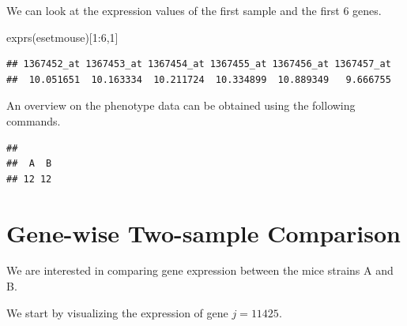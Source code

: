 \documentclass[
]{book}
\newenvironment{Shaded}{\begin{snugshade}}{\end{snugshade}}
\newcommand{\CommentTok}[1]{\textcolor[rgb]{0.56,0.35,0.01}{\textit{#1}}}
\newcommand{\DecValTok}[1]{\textcolor[rgb]{0.00,0.00,0.81}{#1}}
\newcommand{\FunctionTok}[1]{\textcolor[rgb]{0.00,0.00,0.00}{#1}}
\newcommand{\NormalTok}[1]{#1}
\newcommand{\OtherTok}[1]{\textcolor[rgb]{0.56,0.35,0.01}{#1}}
\newcommand{\SpecialCharTok}[1]{\textcolor[rgb]{0.00,0.00,0.00}{#1}}
\begin{document}
We can look at the expression values of the first sample and the first 6 genes.

\begin{Shaded}
\begin{Highlighting}[]
\FunctionTok{exprs}\NormalTok{(esetmouse)[}\DecValTok{1}\SpecialCharTok{:}\DecValTok{6}\NormalTok{,}\DecValTok{1}\NormalTok{]}
\end{Highlighting}
\end{Shaded}

\begin{verbatim}
## 1367452_at 1367453_at 1367454_at 1367455_at 1367456_at 1367457_at 
##  10.051651  10.163334  10.211724  10.334899  10.889349   9.666755
\end{verbatim}

An overview on the phenotype data can be obtained using the following commands.

\begin{Shaded}
\end{Shaded}

\begin{verbatim}
## 
##  A  B 
## 12 12
\end{verbatim}

\hypertarget{gene-wise-two-sample-comparison}{%
\section{Gene-wise Two-sample Comparison}\label{gene-wise-two-sample-comparison}}

We are interested in comparing gene expression between the
mice strains A and B.

\begin{Shaded}
\end{Shaded}

We start by visualizing the expression of gene \(j=11425\).
\end{document}
